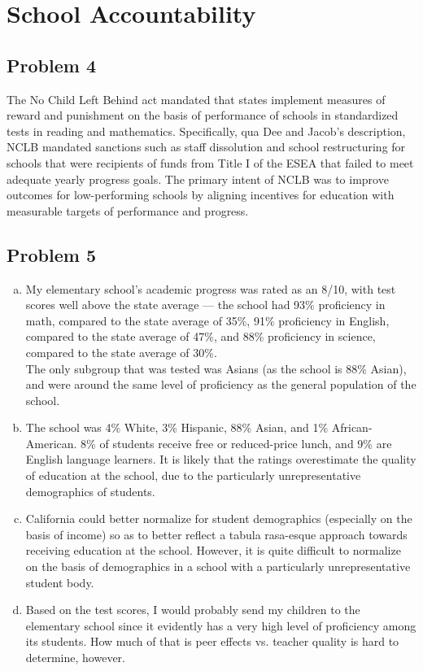 \documentclass[10pt]{extarticle}
\begin{document}
  \section{School Accountability}%
  \subsection{Problem 4}%
  The No Child Left Behind act mandated that states implement measures of reward and punishment on the basis of performance of schools in standardized tests in reading and mathematics. Specifically, qua Dee and Jacob's description, NCLB mandated sanctions such as staff dissolution and school restructuring for schools that were recipients of funds from Title I of the ESEA that failed to meet adequate yearly progress goals. The primary intent of NCLB was to improve outcomes for low-performing schools by aligning incentives for education with measurable targets of performance and progress.
  \subsection{Problem 5}%
  \begin{enumerate}[(a)]
    \item My elementary school's academic progress was rated as an 8/10, with test scores well above the state average --- the school had 93\% proficiency in math, compared to the state average of 35\%, 91\% proficiency in English, compared to the state average of 47\%, and 88\% proficiency in science, compared to the state average of 30\%.\\

      The only subgroup that was tested was Asians (as the school is 88\% Asian), and were around the same level of proficiency as the general population of the school.
    \item The school was 4\% White, 3\% Hispanic, 88\% Asian, and 1\% African-American. 8\% of students receive free or reduced-price lunch, and 9\% are English language learners. It is likely that the ratings overestimate the quality of education at the school, due to the particularly unrepresentative demographics of students.
    \item California could better normalize for student demographics (especially on the basis of income) so as to better reflect a tabula rasa-esque approach towards receiving education at the school. However, it is quite difficult to normalize on the basis of demographics in a school with a particularly unrepresentative student body.
    \item Based on the test scores, I would probably send my children to the elementary school since it evidently has a very high level of proficiency among its students. How much of that is peer effects vs. teacher quality is hard to determine, however.
  \end{enumerate}
\end{document}
